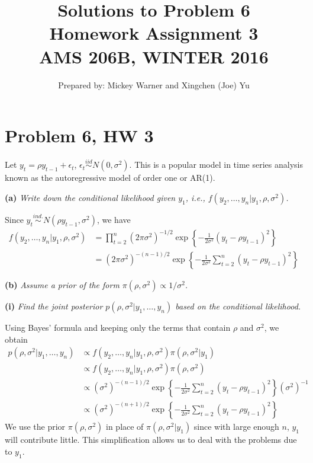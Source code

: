 \documentclass[12pt]{article}
\begin{document}
\title{Solutions to Problem 6 \\
Homework Assignment 3 \\
{\small {\bf AMS 206B, WINTER 2016 }} \\
}

\author{Prepared by: Mickey Warner and Xingchen (Joe) Yu}

\maketitle

\section*{Problem 6, HW 3}
\noindent Let $y_t=\rho y_{t-1} + \epsilon_t$, $\epsilon_t \overset{iid}\sim N(0,\sigma^2)$. This is a popular model in time series analysis known as the autoregressive model of order one or AR(1).

\noindent \textbf{(a)} \emph{Write down the conditional likelihood given $y_1$, i.e., $f(y_2,\ldots,y_n|y_1,\rho,\sigma^2)$.}
\bigskip

\noindent Since $y_t \overset{ind.}\sim N(\rho y_{t-1}, \sigma^2)$, we have
\begin{align*}
f(y_2,\ldots,y_n|y_1,\rho,\sigma^2) &= \prod_{t=2}^n (2\pi\sigma^2)^{-1/2}\exp\left\{-\frac{1}{2\sigma^2}(y_t-\rho y_{t-1})^2\right\} \\
&= (2\pi\sigma^2)^{-(n-1)/2} \exp\left\{-\frac{1}{2\sigma^2}\sum_{t=2}^n(y_t-\rho y_{t-1})^2\right\}
\end{align*}

\bigskip
\noindent \textbf{(b)} \emph{Assume a prior of the form $\pi(\rho, \sigma^2) \propto 1/\sigma^2$.}
\bigskip

\noindent \textbf{(i)} \emph{Find the joint posterior $p(\rho, \sigma^2|y_1,\ldots, y_n)$ based on the conditional likelihood.}
\bigskip

\noindent Using Bayes' formula and keeping only the terms that contain $\rho$ and $\sigma^2$, we obtain
\begin{align*}
p(\rho, \sigma^2|y_1, \ldots, y_n) &\propto f(y_2,\ldots,y_n|y_1,\rho,\sigma^2)\pi(\rho,\sigma^2|y_1) \\
&\propto f(y_2,\ldots,y_n|y_1,\rho,\sigma^2)\pi(\rho,\sigma^2) \\
&\propto (\sigma^2)^{-(n-1)/2} \exp\left\{-\frac{1}{2\sigma^2}\sum_{t=2}^n(y_t-\rho y_{t-1})^2\right\}(\sigma^2)^{-1} \\
&\propto (\sigma^2)^{-(n+1)/2} \exp\left\{-\frac{1}{2\sigma^2}\sum_{t=2}^n(y_t-\rho y_{t-1})^2\right\}
\end{align*}
\noindent We use the prior $\pi(\rho,\sigma^2)$ in place of $\pi(\rho,\sigma^2|y_1)$ since with large enough $n$, $y_1$ will contribute little. This simplification allows us to deal with the problems due to $y_1$.
\end{document}
